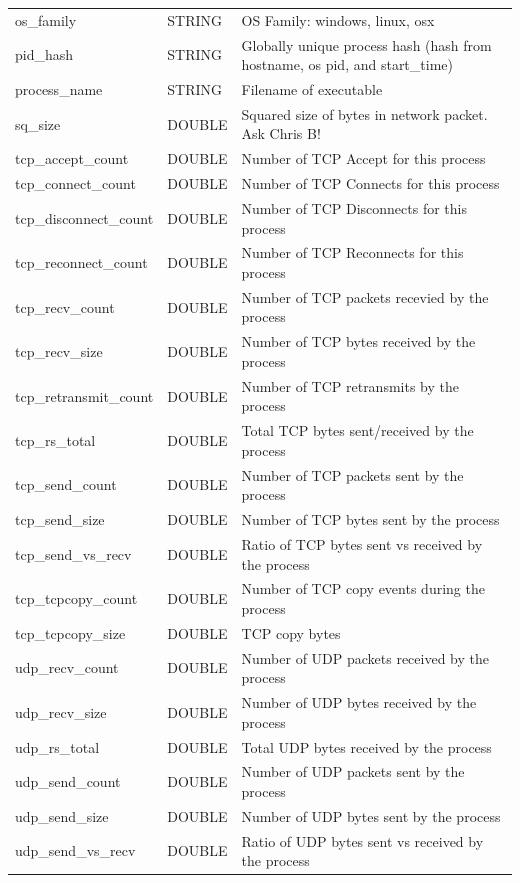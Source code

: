 \documentclass[conference,compsoc]{IEEEtran}
\begin{document}
\begin{longtable}{|p{5cm}|p{2cm}|p{9cm}|}
os\_family & STRING & OS Family: windows, linux, osx \\
pid\_hash & STRING & Globally unique process hash (hash from hostname, os pid, and start\_time) \\
process\_name & STRING & Filename of executable \\
sq\_size & DOUBLE & Squared size of bytes in network packet. Ask Chris B! \\
tcp\_accept\_count & DOUBLE & Number of TCP Accept for this process \\
tcp\_connect\_count & DOUBLE & Number of TCP Connects for this process \\
tcp\_disconnect\_count & DOUBLE & Number of TCP Disconnects for this process \\
tcp\_reconnect\_count & DOUBLE & Number of TCP Reconnects for this process \\
tcp\_recv\_count & DOUBLE & Number of TCP packets recevied by the process \\
tcp\_recv\_size & DOUBLE & Number of TCP bytes received by the process \\
tcp\_retransmit\_count & DOUBLE & Number of TCP retransmits by the process \\
tcp\_rs\_total & DOUBLE & Total TCP bytes sent/received by the process \\
tcp\_send\_count & DOUBLE & Number of TCP packets sent by the process \\
tcp\_send\_size & DOUBLE & Number of TCP bytes sent by the process \\
tcp\_send\_vs\_recv & DOUBLE & Ratio of TCP bytes sent vs received by the process \\
tcp\_tcpcopy\_count & DOUBLE & Number of TCP copy events during the process \\
tcp\_tcpcopy\_size & DOUBLE & TCP copy bytes \\
udp\_recv\_count & DOUBLE & Number of UDP packets received by the process \\
udp\_recv\_size & DOUBLE & Number of UDP bytes received by the process \\
udp\_rs\_total & DOUBLE & Total UDP bytes received by the process \\
udp\_send\_count & DOUBLE & Number of UDP packets sent by the process \\
udp\_send\_size & DOUBLE & Number of UDP bytes sent by the process \\
udp\_send\_vs\_recv & DOUBLE & Ratio of UDP bytes sent vs received by the process \\
\hline
\end{longtable}
\end{document}
